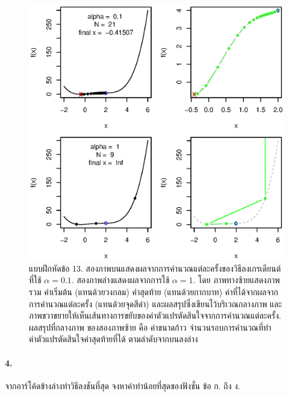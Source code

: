 %
\begin{figure}
\begin{center}
\includegraphics[width=6.0in]
{02Background/gdStepSizeDiverge.eps} 
\end{center}
\caption{แบบฝึกหัดข้อ 13. สองภาพบนแสดงผลจากการคำนวณแต่ละครั้งของวิธีลงเกรเดียนต์ที่ใช้ $\alpha = 0.1$.
สองภาพล่างแสดงผลจากการใช้ $\alpha = 1$.
โดย ภาพทางซ้ายแสดงภาพรวม ค่าเริ่มต้น (แทนด้วยวงกลม) ค่าสุดท้าย (แทนด้วยกากบาท) ค่าที่ได้จากผลจากการคำนวณแต่ละครั้ง (แทนด้วยจุดสีดำ) และผลสรุปซึ่งเขียนไว้บริเวณกลางภาพ
และภาพขวาขยายให้เห็นเส้นทางการขยับของค่าตัวแปรตัดสินใจจากการคำนวณแต่ละครั้ง.
ผลสรุปที่กลางภาพ ของสองภาพซ้าย คือ ค่าขนาดก้าว จำนวนรอบการคำนวณที่ทำ ค่าตัวแปรตัดสินใจค่าสุดท้ายที่ได้ ตามลำดับจากบนลงล่าง}
\label{fig: gd large step size diverge}
\end{figure}

\paragraph{4.} 
จากอาร์โค้ดข้างล่างทำวิธีลงชันที่สุด จงหาค่าทำน้อยที่สุดของฟังชั่น ข้อ ก. ถึง ง.


